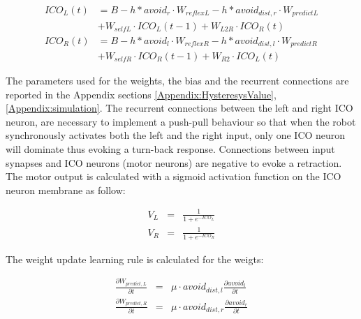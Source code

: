 \begin{eqnarray}
ICO_{L}(t)&=B-h \ast avoid_r\cdot W_{reflexL}-h \ast avoid_{dist,r}\cdot W_{predictL}\\ \nonumber
	  &+W_{selfL}\cdot ICO_{L}(t-1) + W_{L2R}\cdot ICO_{R}(t) \label{eq:ICO:L1} \\ 
ICO_{R}(t)&=B-h \ast avoid_l\cdot W_{reflexR}-h \ast avoid_{dist,l}\cdot W_{predictR}\\ \nonumber
	  &+W_{selfR}\cdot ICO_{R}(t-1) + W_{R2}\cdot ICO_{L}(t)  \label{eq:ICO:R1}
\end{eqnarray}

The parameters used for the weights, the bias and the recurrent connections are
reported in the Appendix sections \ref{Appendix:HysteresysValue},\ref{Appendix:simulation}.
The recurrent connections between the left and right ICO neuron, are necessary
to implement a push-pull behaviour so that when the robot synchronously activates
both the left and the right input, only one ICO neuron will dominate thus evoking
a turn-back response. 
Connections between input synapses and ICO neurons (motor neurons) are
negative to evoke a retraction. 
The motor output is calculated with a sigmoid activation function on the ICO neuron
membrane as follow:

\begin{eqnarray}
V_{L}&=& \frac{1}{1+e^{-ICO_{L}}}\\
V_{R}&=& \frac{1}{1+e^{-ICO_{R}}}
\end{eqnarray}

The weight update learning rule is calculated for the weigts:

\begin{eqnarray}
\frac{\partial W_{predict,L}}{\partial t}&=& \mu \cdot avoid_{dist,l} \frac{\partial avoid_{l}}{\partial t}\\
\frac{\partial W_{predict,R}}{\partial t}&=& \mu \cdot avoid_{dist,r} \frac{\partial avoid_{r}}{\partial t}
\end{eqnarray}


